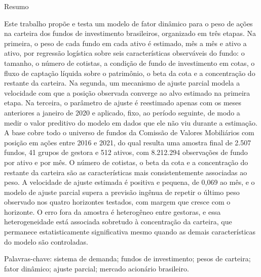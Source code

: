 \documentclass[12pt,a4paper]{article}
\begin{document}
\begin{center}{\large Resumo}\end{center}
\begin{singlespace}
\noindent
Este trabalho propõe e testa um modelo de fator dinâmico para o peso de ações na carteira
dos fundos de investimento brasileiros, organizado em três etapas. Na primeira, o peso de
cada fundo em cada ativo é estimado, mês a mês e ativo a ativo, por regressão logística
sobre seis características observáveis do fundo: o tamanho, o número de cotistas,
a condição de fundo de investimento em cotas, o fluxo de captação líquida sobre o
patrimônio, o beta da cota e a concentração do restante da carteira. Na segunda, um
mecanismo de ajuste parcial modela a velocidade com que a posição observada converge ao
alvo estimado na primeira etapa. Na terceira, o parâmetro de ajuste é reestimado apenas
com os meses anteriores a janeiro de 2020 e aplicado, fixo, ao período seguinte, de modo a
medir o valor preditivo do modelo em dados que ele não viu durante a estimação. A base
cobre todo o universo de fundos da Comissão de Valores Mobiliários com posição em ações
entre 2016 e 2021, do qual resulta uma amostra final de 2.507 fundos, 41 grupos de gestora
e 512 ativos, com 8.212.294 observações de fundo por ativo e por mês. O número de
cotistas, o beta da cota e a concentração do restante da carteira são as características
mais consistentemente associadas ao peso. A velocidade de ajuste estimada é positiva e
pequena, de 0,069 ao mês, e o modelo de ajuste parcial supera a previsão ingênua de
repetir o último peso observado nos quatro horizontes testados, com margem que cresce com
o horizonte. O erro fora da amostra é heterogêneo entre gestoras, e essa heterogeneidade
está associada sobretudo à concentração da carteira, que permanece estatisticamente
significativa mesmo quando as demais características do modelo são controladas.

\smallskip
\noindent Palavras-chave: sistema de demanda; fundos de investimento; pesos de carteira;
fator dinâmico; ajuste parcial; mercado acionário brasileiro.
\end{singlespace}


\newpage
\end{document}
